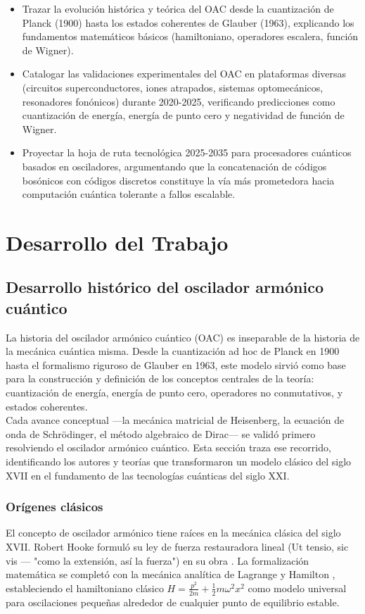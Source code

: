 \documentclass[11pt,a4paper,spanish]{book}
\begin{document}
\begin{itemize}
	\item Trazar la evolución histórica y teórica del OAC desde la cuantización de Planck (1900) hasta los estados coherentes de Glauber (1963), explicando los fundamentos matemáticos básicos (hamiltoniano, operadores escalera, función de Wigner).
	\item Catalogar las validaciones experimentales del OAC en plataformas diversas (circuitos superconductores, iones atrapados, sistemas optomecánicos, resonadores fonónicos) durante 2020-2025, verificando predicciones como cuantización de energía, energía de punto cero y negatividad de función de Wigner.
	\item Proyectar la hoja de ruta tecnológica 2025-2035 para procesadores cuánticos basados en osciladores, argumentando que la concatenación de códigos bosónicos con códigos discretos constituye la vía más prometedora hacia computación cuántica tolerante a fallos escalable.
\end{itemize} 



\chapter{Desarrollo del Trabajo}


\section{Desarrollo histórico del oscilador armónico cuántico}

La historia del oscilador armónico cuántico (OAC) es inseparable de la historia de la mecánica cuántica misma. Desde la cuantización ad hoc de Planck en 1900 hasta el formalismo riguroso de Glauber en 1963, este modelo sirvió como base para la construcción y definición de los conceptos centrales de la teoría: cuantización de energía, energía de punto cero, operadores no conmutativos, y estados coherentes. \\

Cada avance conceptual —la mecánica matricial de Heisenberg, la ecuación de onda de Schrödinger, el método algebraico de Dirac— se validó primero resolviendo el oscilador armónico cuántico. Esta sección traza ese recorrido, identificando los autores y teorías que transformaron un modelo clásico del siglo XVII en el fundamento de las tecnologías cuánticas del siglo XXI.

\subsection*{Orígenes clásicos}
El concepto de oscilador armónico tiene raíces en la mecánica clásica del siglo XVII. Robert Hooke formuló su ley de fuerza restauradora lineal (Ut tensio, sic vis — "como la extensión, así la fuerza") en su obra \cite{hooke1678}. La formalización matemática se completó con la mecánica analítica de Lagrange \citep{lagrange1788} y Hamilton \citep{hamilton1834, hamilton1835} , estableciendo el hamiltoniano clásico $H = \frac{p^2}{2m} + \frac{1}{2}m\omega^2 x^2$ como modelo universal para oscilaciones pequeñas alrededor de cualquier punto de equilibrio estable.\\
\end{document}
